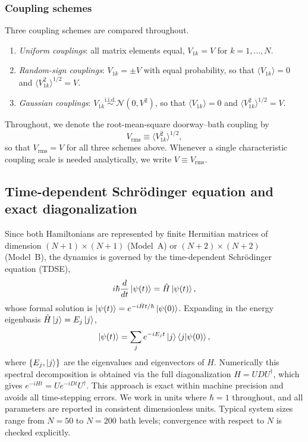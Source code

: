 \documentclass[aps,prx,reprint,showpacs,showkeys,floatfix]{revtex4-2}
\begin{document}
\subsubsection{Coupling schemes}

Three coupling schemes are compared throughout.
\begin{enumerate}
    \item \emph{Uniform couplings}: all matrix elements equal,
          $V_{1k} = V$ for $k = 1,\ldots,N$.
    \item \emph{Random-sign couplings}: $V_{1k} = \pm V$ with equal probability,
          so that $\langle V_{1k}\rangle = 0$ and
          $\langle V_{1k}^2\rangle^{1/2} = V$.
    \item \emph{Gaussian couplings}: $V_{1k}\overset{\mathrm{i.i.d.}}{\sim}
          \mathcal{N}(0,V^2)$, so that $\langle V_{1k}\rangle = 0$ and
          $\langle V_{1k}^2\rangle^{1/2} = V$.
\end{enumerate}
Throughout, we denote the root-mean-square doorway--bath coupling by
\begin{equation*}
    V_{\mathrm{rms}} \equiv \langle V_{1k}^2 \rangle^{1/2},
\end{equation*}
so that $V_{\mathrm{rms}}=V$ for all three schemes above.  Whenever a
single characteristic coupling scale is needed analytically, we write
$V \equiv V_{\mathrm{rms}}$.

\subsection{Time-dependent Schr\"{o}dinger equation and exact diagonalization}
\label{sec:TDSE}

Since both Hamiltonians are represented by finite Hermitian matrices of
dimension $(N+1)\times(N+1)$ (Model~A) or $(N+2)\times(N+2)$ (Model~B),
the dynamics is governed by the time-dependent Schr\"{o}dinger equation
(TDSE),
\begin{equation}
    i\hbar\frac{d}{dt}\ket{\psi(t)} = \hat{H}\ket{\psi(t)},
    \label{eq:TDSE}
\end{equation}
whose formal solution is $\ket{\psi(t)}=e^{-i\hat{H}t/\hbar}\ket{\psi(0)}$.
Expanding in the energy eigenbasis $\hat{H}\ket{j}=E_j\ket{j}$,
\begin{equation}
    \ket{\psi(t)} = \sum_j e^{-iE_j t}\ket{j}\braket{j|\psi(0)},
    \label{eq:psit}
\end{equation}
where $\{E_j,\ket{j}\}$ are the eigenvalues and eigenvectors of $H$.
Numerically this spectral decomposition is obtained via the full
diagonalization $H = UDU^\dagger$, which gives
$e^{-iHt} = Ue^{-iDt}U^\dagger$.
This approach is exact within machine precision and avoids all time-stepping
errors.  We work in units where $\hbar = 1$ throughout, and all parameters
are reported in consistent dimensionless units.  Typical system sizes range
from $N = 50$ to $N = 200$ bath levels; convergence with respect to $N$ is
checked explicitly.
\end{document}
